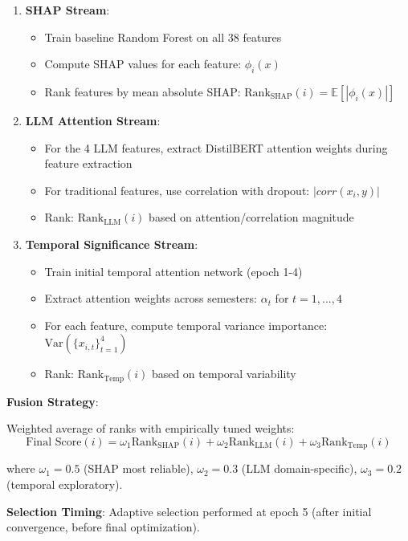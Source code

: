\begin{enumerate}
\item \textbf{SHAP Stream}:
\begin{itemize}
\item Train baseline Random Forest on all 38 features
\item Compute SHAP values for each feature: $\phi_i(x)$
\item Rank features by mean absolute SHAP: $\text{Rank}_{\text{SHAP}}(i) = \mathbb{E}[|\phi_i(x)|]$
\end{itemize}

\item \textbf{LLM Attention Stream}:
\begin{itemize}
\item For the 4 LLM features, extract DistilBERT attention weights during feature extraction
\item For traditional features, use correlation with dropout: $|corr(x_i, y)|$
\item Rank: $\text{Rank}_{\text{LLM}}(i)$ based on attention/correlation magnitude
\end{itemize}

\item \textbf{Temporal Significance Stream}:
\begin{itemize}
\item Train initial temporal attention network (epoch 1-4)
\item Extract attention weights across semesters: $\alpha_t$ for $t=1,...,4$
\item For each feature, compute temporal variance importance: $\text{Var}(\{x_{i,t}\}_{t=1}^{4})$
\item Rank: $\text{Rank}_{\text{Temp}}(i)$ based on temporal variability
\end{itemize}
\end{enumerate}

\textbf{Fusion Strategy}:

Weighted average of ranks with empirically tuned weights:
$$\text{Final Score}(i) = \omega_1 \text{Rank}_{\text{SHAP}}(i) + \omega_2 \text{Rank}_{\text{LLM}}(i) + \omega_3 \text{Rank}_{\text{Temp}}(i)$$

where $\omega_1 = 0.5$ (SHAP most reliable), $\omega_2 = 0.3$ (LLM domain-specific), $\omega_3 = 0.2$ (temporal exploratory).

\textbf{Selection Timing}: Adaptive selection performed at epoch 5 (after initial convergence, before final optimization).

